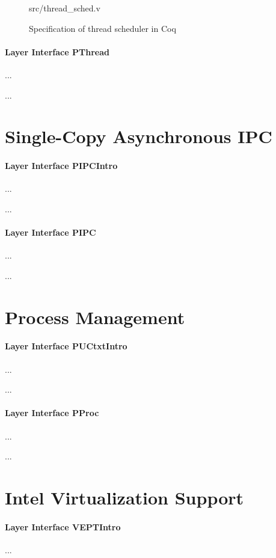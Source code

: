 \begin{figure}
	 {src/thread_sched.v}
	\caption{Specification of thread scheduler in Coq}
	\label{fig:thread_sched_v}
\end{figure}

\paragraph{Layer Interface PThread}
...

...

\section{Single-Copy Asynchronous IPC}

\paragraph{Layer Interface PIPCIntro}
...

...

\paragraph{Layer Interface PIPC}
...

...

\section{Process Management}

\paragraph{Layer Interface PUCtxtIntro}
...

...

\paragraph{Layer Interface PProc}
...

...

\section{Intel Virtualization Support}

\paragraph{Layer Interface VEPTIntro}
...

